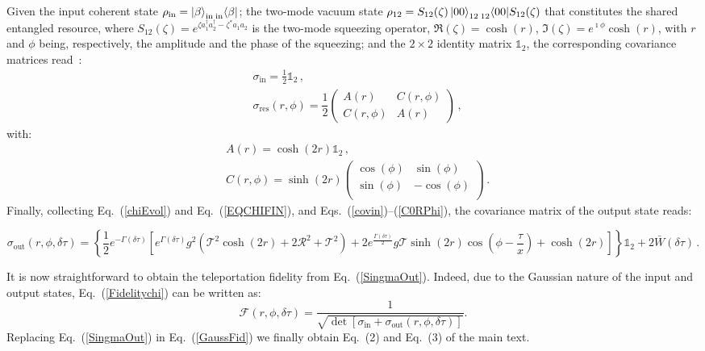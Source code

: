 \documentclass[prl,twocolumn,aps,floatfix,showpacs,tightenlines,superscriptaddress,amsmath,amssymb,amsfonts,10pt]{revtex4-1}
\begin{document}
Given the input coherent state $\rho_{\textrm{in}}=\ket{\beta}_{\textrm{in}}\prescript{}{\textrm{in}}{\bra{\beta}}$; the two-mode vacuum state $\rho_{12}=S_{12}(\zeta)\ket{00}_{12}\prescript{}{12}{\bra{00}}S_{12}(\zeta)$ that constitutes the shared entangled resource, where $S_{12}(\zeta)=e^{\zeta a_1^\dag a_2^\dag-\zeta^* a_1 a_2}$ is the two-mode squeezing operator, $\Re(\zeta)=\cosh(r)$, $\Im(\zeta)=e^{\imath\phi}\cosh(r)$, with $r$ and $\phi$ being, respectively, the amplitude and the phase of the squeezing; and the $2 \times 2$ identity matrix $\mathbb{1}_2$, the corresponding covariance matrices read~\cite{ferraroLib}:
	\begin{align}
	& \sigma_{\textrm{in}}=\frac{1}{2}\mathbb{1}_2 \, , \label{covin} \\ & \sigma_{\textrm{res}}(r,\phi)=\dfrac{1}{2}\left(\begin{array}{cc}
	A(r)	& C(r,\phi) \\
	C(r,\phi) & A(r)
	\end{array} \right) \, , \label{TMRES}
	\end{align}
with:
\begin{align}
	 &A(r)=\cosh(2 r)\mathbb{1}_2 \, , \label{A0R} \\
	 &C(r,\phi)=\sinh(2 r)\left(
	 \begin{array}{cc}
	 \cos (\phi ) & \sin (\phi ) \\
	 \sin (\phi ) & -\cos (\phi ) \\
	 \end{array}
	 \right) \, . \label{C0RPhi}
\end{align}
Finally, collecting Eq.~(\ref{chiEvol}) and Eq.~(\ref{EQCHIFIN}), and Eqs.~(\ref{covin})--(\ref{C0RPhi}), the covariance matrix of the output state reads:
\begin{widetext}
	\begin{equation}\label{SingmaOut}
	\sigma_{\textrm{out}}(r,\phi,\delta\tau)\!\!=\!\!\left\lbrace
	\frac{1}{2} e^{-\Gamma(\delta\tau) }\!\! \left[e^{\Gamma(\delta\tau) } g^2 \left(\mathcal{T}^2 \cosh (2 r)\!+\!2 	\mathcal{R}^2\!+\!\mathcal{T}^2\right)\!+\!2 e^{\frac{\Gamma(\delta\tau)}{2}} g \mathcal{T} \sinh (2 r) \cos\left(\phi\!-\!\frac{\tau}{x}\right)\!+\!\cosh (2 r)\right]
	\right\rbrace\mathbb{1}_2+2\bar{W}(\delta\tau) \, .
	\end{equation}
\end{widetext}
It is now straightforward to obtain the teleportation fidelity from Eq.~(\ref{SingmaOut}). Indeed, due to the
Gaussian nature of the input and output states, Eq.~(\ref{Fidelitychi}) can be written as:
\begin{equation}\label{GaussFid}
\mathcal{F}(r,\phi,\delta \tau)=\dfrac{1}{\sqrt{\det[\sigma_{\textrm{in}}+\sigma_{\textrm{out}}(r,\phi,\delta\tau)]}}.
\end{equation}
Replacing Eq.~(\ref{SingmaOut}) in Eq.~(\ref{GaussFid}) we finally obtain Eq.~(2) and Eq.~(3) of the main text.
\end{document}
